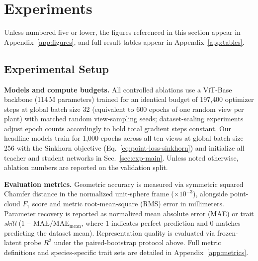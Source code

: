\documentclass[10pt,twocolumn,letterpaper]{article}
\begin{document}
\section{Experiments}
\label{sec:results}\label{sec:experiments}

Unless numbered five or lower, the figures referenced in this section appear in Appendix~\ref{app:figures}, and full result tables appear in Appendix~\ref{app:tables}.

\subsection{Experimental Setup}
\label{sec:setup}\label{sec:exp-setup}

\noindent\textbf{Models and compute budgets.}
All controlled ablations use a ViT-Base backbone (114\,M parameters) trained for an identical budget of 197{,}400 optimizer steps at global batch size 32 (equivalent to 600 epochs of one random view per plant) with matched random view-sampling seeds; dataset-scaling experiments adjust epoch counts accordingly to hold total gradient steps constant. Our headline models train for 1{,}000 epochs across all ten views at global batch size 256 with the Sinkhorn objective (Eq.~\ref{eq:point-loss-sinkhorn}) and initialize all teacher and student networks in Sec.~\ref{sec:exp-main}. Unless noted otherwise, ablation numbers are reported on the validation split.

\noindent\textbf{Evaluation metrics.}
Geometric accuracy is measured via symmetric squared Chamfer distance in the normalized unit-sphere frame ($\times 10^{-3}$), alongside point-cloud $F_1$ score and metric root-mean-square (RMS) error in millimeters. Parameter recovery is reported as normalized mean absolute error (MAE) or trait \emph{skill} ($1 - \mathrm{MAE}/\mathrm{MAE}_{\mathrm{mean}}$, where $1$ indicates perfect prediction and $0$ matches predicting the dataset mean). Representation quality is evaluated via frozen-latent probe $R^2$ under the paired-bootstrap protocol above. Full metric definitions and species-specific trait sets are detailed in Appendix~\ref{app:metrics}.
\end{document}
